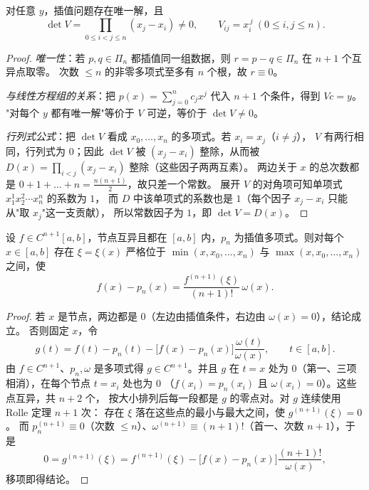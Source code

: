\begin{theorem}
\label{thm:unique}
对任意 $y$，插值问题存在唯一解，且
\[
  \det V=\prod_{0\le i<j\le n}(x_j-x_i)\ne0,\qquad
  V_{ij}=x_i^{\,j}\ (0\le i,j\le n).
\]
\end{theorem}

\begin{proof}
\emph{唯一性}：若 $p,q\in\Pi_n$ 都插值同一组数据，则 $r=p-q\in\Pi_n$ 在 $n+1$ 个互异点取零。
次数 $\le n$ 的非零多项式至多有 $n$ 个根，故 $r\equiv0$。

\emph{与线性方程组的关系}：把 $p(x)=\sum_{j=0}^nc_jx^j$ 代入 $n+1$ 个条件，得到 $Vc=y$。
"对每个 $y$ 都有唯一解"等价于 $V$ 可逆，等价于 $\det V\ne0$。

\emph{行列式公式}：把 $\det V$ 看成 $x_0,\dots,x_n$ 的多项式。若 $x_i=x_j$（$i\ne j$），
$V$ 有两行相同，行列式为 $0$；因此 $\det V$ 被 $(x_j-x_i)$ 整除，从而被
$D(x)=\prod_{i<j}(x_j-x_i)$ 整除（这些因子两两互素）。
两边关于 $x$ 的总次数都是 $0+1+\dots+n=\tfrac{n(n+1)}2$，故只差一个常数。
展开 $V$ 的对角项可知单项式 $x_1^{1}x_2^{2}\cdots x_n^{n}$ 的系数为 $1$，
而 $D$ 中该单项式的系数也是 $1$（每个因子 $x_j-x_i$ 只能从"取 $x_j$"这一支贡献），
所以常数因子为 $1$，即 $\det V=D(x)$。
\end{proof}

\begin{theorem}[插值误差公式]
\label{thm:error}
设 $f\in C^{n+1}[a,b]$，节点互异且都在 $[a,b]$ 内，$p_n$ 为插值多项式。则对每个 $x\in[a,b]$
存在 $\xi=\xi(x)$ 严格位于 $\min(x,x_0,\dots,x_n)$ 与 $\max(x,x_0,\dots,x_n)$ 之间，使
\[
  f(x)-p_n(x)=\frac{f^{(n+1)}(\xi)}{(n+1)!}\,\omega(x).
\]
\end{theorem}

\begin{proof}
若 $x$ 是节点，两边都是 $0$（左边由插值条件，右边由 $\omega(x)=0$），结论成立。
否则固定 $x$，令
\[
  g(t)=f(t)-p_n(t)-\bigl[f(x)-p_n(x)\bigr]\frac{\omega(t)}{\omega(x)},\qquad t\in[a,b].
\]
由 $f\in C^{n+1}$、$p_n,\omega$ 是多项式得 $g\in C^{n+1}$。并且
$g$ 在 $t=x$ 处为 $0$（第一、三项相消），在每个节点 $t=x_i$ 处也为 $0$
（$f(x_i)=p_n(x_i)$ 且 $\omega(x_i)=0$）。这些点互异，共 $n+2$ 个，
按大小排列后每一段都是 $g$ 的零点对。对 $g$ 连续使用 Rolle 定理 $n+1$ 次：
存在 $\xi$ 落在这些点的最小与最大之间，使 $g^{(n+1)}(\xi)=0$。
而 $p_n^{(n+1)}\equiv0$（次数 $\le n$）、$\omega^{(n+1)}\equiv(n+1)!$（首一、次数 $n+1$），于是
\[
  0=g^{(n+1)}(\xi)=f^{(n+1)}(\xi)-\bigl[f(x)-p_n(x)\bigr]\frac{(n+1)!}{\omega(x)},
\]
移项即得结论。
\end{proof}

